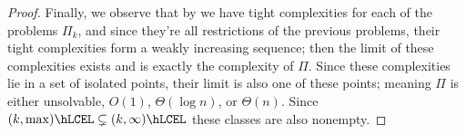 \documentclass[12pt,a4paper]{article}
\begin{document}
\begin{proof}
    Finally, we observe that by  we have tight complexities for each of the problems $\Pi_k$, and since they're all restrictions of the previous problems, their tight complexities form a weakly increasing sequence; then the limit of these complexities exists and is exactly the complexity of $\Pi$. Since these complexities lie in a set of isolated points, their limit is also one of these points; meaning $\Pi$ is either unsolvable, $O(1)$, $\Theta(\log n)$, or $\Theta(n)$. Since $(k,\max)\hLCEL\subsetneq(k,\infty)\hLCEL$ these classes are also nonempty. %
\end{proof}
\end{document}

